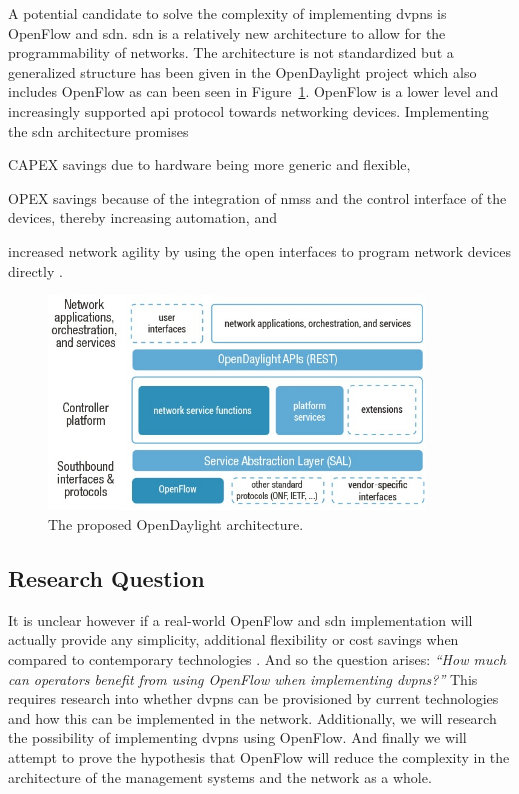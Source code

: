 A potential candidate to solve the complexity of implementing \acp{dvpn} is OpenFlow \cite{openflow} and \ac{sdn}. \ac{sdn} is a relatively new architecture to allow for the programmability of networks. The architecture is not standardized but a generalized structure has been given in the OpenDaylight project \cite{opendaylight} which also includes OpenFlow as can been seen in Figure~\ref{fig:opendaylight}. OpenFlow is a lower level and increasingly supported \ac{api} protocol towards networking devices. Implementing the \ac{sdn} architecture promises
\begin{inparaenum}
	\item CAPEX savings due to hardware being more generic and flexible,
	\item OPEX savings because of the integration of \acp{nms} and the control interface of the devices, thereby increasing automation, and
	\item increased network agility by using the open interfaces to program network devices directly \cite{packet-circuit}.
	\end{inparaenum} 

\begin{figure}[!h]
	\centering
	\includegraphics[width=10cm]{./includes/opendaylight.jpg}
	\caption{The proposed OpenDaylight architecture.}
	\label{fig:opendaylight}
\end{figure}

	\subsection{Research Question} %
	\label{sub:research_question}
	It is unclear however if a real-world OpenFlow and \ac{sdn} implementation will actually provide any simplicity, additional flexibility or cost savings when compared to contemporary technologies \cite{programmability-answer}. And so the question arises: \textsl{``How much can operators benefit from using OpenFlow when implementing \aclp{dvpn}?''} 
	This requires research into whether \acp{dvpn} can be provisioned by current technologies and how this can be implemented in the network. Additionally, we will research the possibility of implementing \acp{dvpn} using OpenFlow. And finally we will attempt to prove the hypothesis that OpenFlow will reduce the complexity in the architecture of the management systems and the network as a whole.


